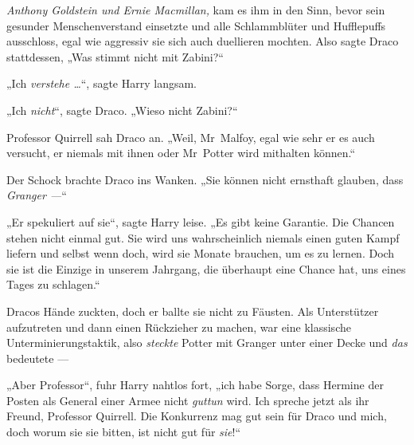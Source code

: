\emph{Anthony Goldstein und Ernie Macmillan,} kam es ihm in den Sinn, bevor sein gesunder Menschenverstand einsetzte und alle Schlammblüter und Hufflepuffs ausschloss, egal wie aggressiv sie sich auch duellieren mochten. Also sagte Draco stattdessen,
„Was stimmt nicht mit Zabini?“

„Ich \emph{verstehe …}“, sagte Harry langsam.

„Ich \emph{nicht}“, sagte Draco.
„Wieso nicht Zabini?“

Professor Quirrell sah Draco an.
„Weil, Mr~Malfoy, egal wie sehr er es auch versucht, er niemals mit ihnen oder Mr~Potter wird mithalten können.“

Der Schock brachte Draco ins Wanken.
„Sie können nicht ernsthaft glauben, dass \emph{Granger —}“

„Er spekuliert auf sie“, sagte Harry leise.
„Es gibt keine Garantie. Die Chancen stehen nicht einmal gut. Sie wird uns wahrscheinlich niemals einen guten Kampf liefern und selbst wenn doch, wird sie Monate brauchen, um es zu lernen. Doch sie ist die Einzige in unserem Jahrgang, die überhaupt eine Chance hat, uns eines Tages zu schlagen.“

Dracos Hände zuckten, doch er ballte sie nicht zu Fäusten. Als Unterstützer aufzutreten und dann einen Rückzieher zu machen, war eine klassische Unterminierungstaktik, also \emph{steckte} Potter mit Granger unter einer Decke und \emph{das} bedeutete —

„Aber Professor“, fuhr Harry nahtlos fort, „ich habe Sorge, dass Hermine der Posten als General einer Armee nicht \emph{guttun} wird. Ich spreche jetzt als ihr Freund, Professor Quirrell. Die Konkurrenz mag gut sein für Draco und mich, doch worum sie sie bitten, ist nicht gut für \emph{sie}!“

